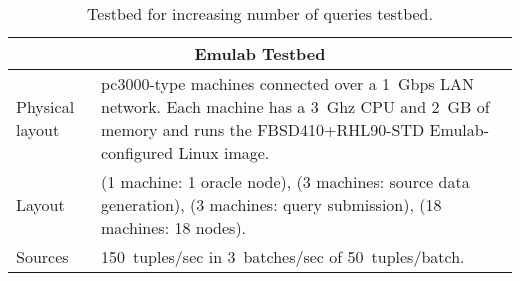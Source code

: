 \begin{table}[h]
  \renewcommand{\arraystretch}{1.5}
  \begin{tabular}{|m{3cm}|p{12cm}|} 
  \hline
 
    \multicolumn{2}{|c|}{\bf Emulab Testbed} \\ 
    \hline\hline
	Physical layout  &	
	pc3000-type machines connected over a 1~Gbps LAN network. Each machine has a 3~Ghz
	CPU and 2~GB of memory and runs the FBSD410+RHL90-STD Emulab-configured Linux image.
	\\
    \hline
	\sys Layout
	&
	(1 machine: 1 oracle node),   
	(3 machines: source data generation), 
	(3 machines: query submission),
	(18 machines: 18 \sys nodes). \\
    \hline
	
	Sources
	& 
	150~tuples/sec in 3~batches/sec of 50~tuples/batch. \\
	
    \hline\hline
    
    
  \end{tabular}
  \caption{Testbed for increasing number of queries testbed.}
  \label{table:inc-testbed}
\end{table}
